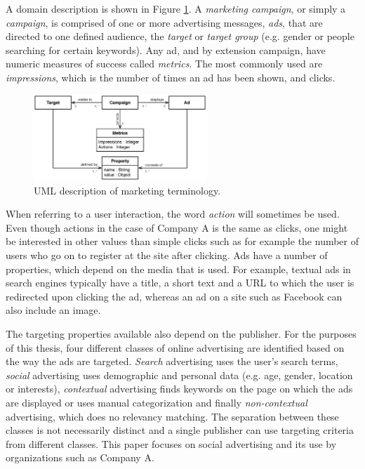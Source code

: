 \documentclass{sig-alternate}
\begin{document}
A domain description is shown in Figure \ref{fig:MarketingTerminology}. A \emph{marketing campaign}, or simply a \emph{campaign}, is comprised of one or more advertising messages, \emph{ads}, that are directed to one defined audience, the \emph{target} or \emph{target group} (e.g. gender or people searching for certain keywords). Any ad, and by extension campaign, have numeric measures of success called \emph{metrics}. The most commonly used are \emph{impressions}, which is the number of times an ad has been shown, and clicks.

\begin{figure}[htb] \centering \includegraphics[width=0.58\textwidth]{marketing-uml.eps}
	\caption{UML description of marketing terminology.}
	\label{fig:MarketingTerminology}
\end{figure}

When referring to a user interaction, the word \emph{action} will sometimes be used. Even though actions in the case of Company A is the same as clicks, one might be interested in other values than simple clicks such as for example the number of users who go on to register at the site after clicking. Ads have a number of properties, which depend on the media that is used. For example, textual ads in search engines typically have a title, a short text and a URL to which the user is redirected upon clicking the ad, whereas an ad on a site such as Facebook can also include an image.

The targeting properties available also depend on the publisher. For the purposes of this thesis, four different classes of online advertising are identified based on the way the ads are targeted. \emph{Search} advertising uses the user's search terms, \emph{social} advertising uses demographic and personal data (e.g. age, gender, location or interests), \emph{contextual} advertising finds keywords on the page on which the ads are displayed or uses manual categorization and finally \emph{non-contextual} advertising, which does no relevancy matching. The separation between these classes is not necessarily distinct and a single publisher can use targeting criteria from different classes. This paper focuses on social advertising and its use by organizations such as Company A.
\end{document}
